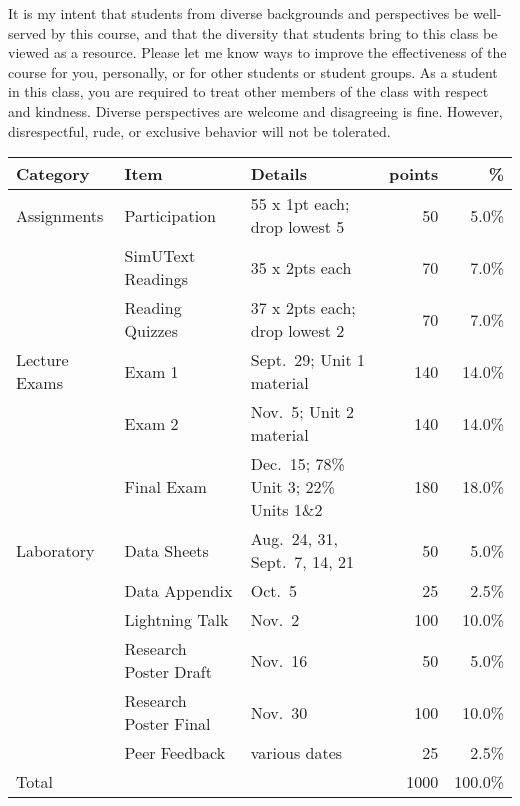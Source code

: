 \documentclass{tufte-handout}
\begin{document}
\begin{fullwidth}
 It is my intent that students from diverse backgrounds and perspectives be well-served by this course, and that the diversity that students bring to this class be viewed as a resource. Please let me know ways to improve the effectiveness of the course for you, personally, or for other students or student groups. As a student in this class, you are required to treat other members of the class with respect and kindness. Diverse perspectives are welcome and disagreeing is fine. However, disrespectful, rude, or exclusive behavior will not be tolerated.


\end{fullwidth}


\begin{fullwidth}



\begin{table}
\begin{tabular}{l l l r r}
Category & Item & Details & points & \% \\
\hline
Assignments & Participation & 55 x 1pt each; drop lowest 5 & 50 & 5.0\% \\
& SimUText Readings   & 35 x 2pts each & 70 & 7.0\% \\
& Reading Quizzes  & 37 x 2pts each; drop lowest 2 & 70 & 7.0\% \\
\hline
Lecture Exams & Exam 1 & Sept.~29; Unit 1 material & 140 & 14.0\% \\
& Exam 2 & Nov.~5; Unit 2 material & 140 & 14.0\% \\
& Final Exam & Dec.~15; 78\% Unit 3; 22\% Units 1\&2 & 180 & 18.0\% \\ 		
\hline
Laboratory & Data Sheets & Aug.~24, 31, Sept.~7, 14, 21 & 50 & 5.0\% \\
& Data Appendix & Oct.~5 & 25 & 2.5\% \\
& Lightning Talk & Nov.~2 & 100 &  10.0\% \\
& Research Poster Draft & Nov.~16 & 50 & 5.0\% \\
& Research Poster Final & Nov.~30 & 100 & 10.0\% \\
& Peer Feedback & various dates & 25 & 2.5\% \\
\hline
Total & & & 1000 & 100.0\% 
\end{tabular}
\end{table}





\end{fullwidth}
\end{document}
